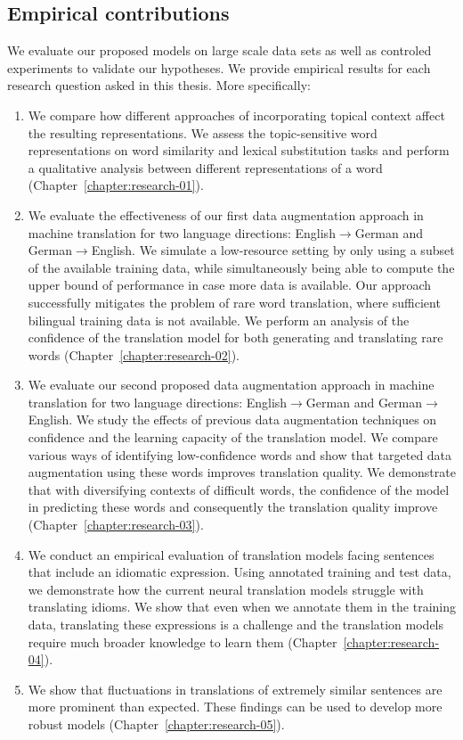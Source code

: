 \subsection{Empirical contributions} 

We evaluate our proposed models on large scale data sets as well as controled experiments to validate our hypotheses. We provide empirical results for each research question asked in this thesis. 
More specifically:

\begin{enumerate}
\item We compare how different approaches of incorporating topical context affect the resulting representations. 
We assess the topic-sensitive word representations on word similarity and lexical substitution tasks and perform a qualitative analysis between different representations of a word (Chapter~\ref{chapter:research-01}).
\item We evaluate the effectiveness of our first data augmentation approach in machine translation for two language directions: English$\rightarrow$German and German$\rightarrow$English.
We simulate a low-resource setting by only using a subset of the available training data, while simultaneously being able to compute the upper bound of performance in case more data is available.
Our approach successfully mitigates the problem of rare word translation, where sufficient bilingual training data is not available. 
We perform an analysis of the confidence of the translation model for both generating and translating rare words (Chapter~\ref{chapter:research-02}).
\item We evaluate our second proposed data augmentation approach in machine translation for two language directions: English$\rightarrow$German and German$\rightarrow$English.
We study the effects of previous data augmentation techniques on confidence and the learning capacity of the translation model. 
We compare various ways of identifying low-confidence words and show that targeted data augmentation using these words improves translation quality.
We demonstrate that with diversifying contexts of difficult words, the confidence of the model in predicting these words and consequently the translation quality improve (Chapter~\ref{chapter:research-03}).
\item We conduct an empirical evaluation of translation models facing sentences that include an idiomatic expression. 
Using annotated training and test data, we demonstrate how the current neural translation models struggle with translating idioms.
We show that even when we annotate them in the training data, translating these expressions is a challenge and the translation models require much broader knowledge to learn them (Chapter~\ref{chapter:research-04}).
\item  We show that fluctuations in translations of extremely similar sentences are more prominent than expected. These findings can be used to develop more robust models (Chapter~\ref{chapter:research-05}).
\end{enumerate}




